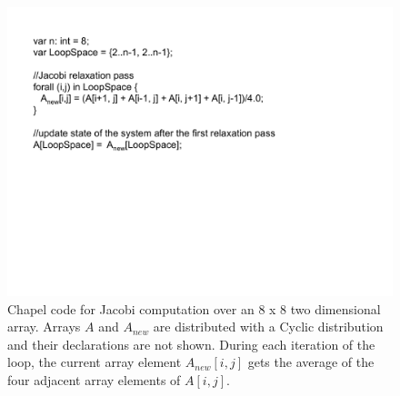 \begin{figure}
\begin{center}
\includegraphics[scale=0.55]{./Figures/jacobi}
\caption{Chapel code for Jacobi computation over an 8 x 8 two dimensional array. Arrays $A$ and $A_{new}$ are distributed with a Cyclic distribution and their declarations are not shown. During each iteration of the loop, the current array element $A_{new}[i, j]$ gets the average of the four adjacent array elements of $A[i, j]$.}
\label{jacobi_code}
\end{center}
\end{figure}

